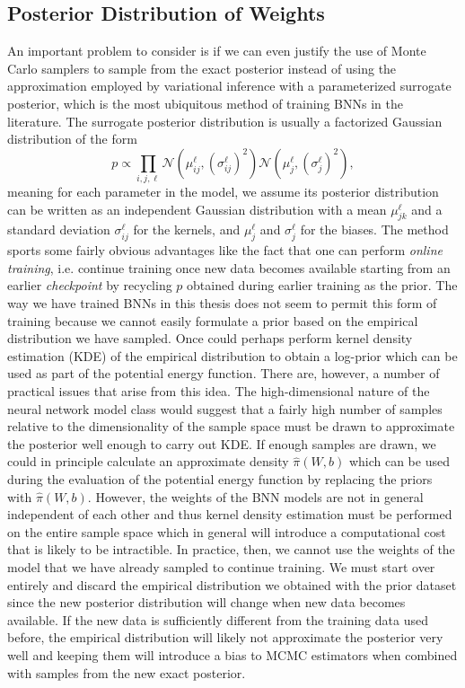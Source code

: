 \subsection{Posterior Distribution of Weights}
An important problem to consider is if we can even justify the use of Monte Carlo samplers to sample from the exact posterior instead of using the approximation employed by variational inference with a parameterized surrogate posterior, which is the most ubiquitous method of training BNNs in the literature. The surrogate posterior distribution is usually a factorized Gaussian distribution of the form
\begin{equation}\label{eq:surrogate_dist}
    p \propto \prod_{i, j, \ell} \mathcal{N}(\mu_{ij}^\ell, (\sigma_{ij}^\ell)^2) \mathcal{N}(\mu_{j}^\ell, (\sigma_{j}^\ell)^2),
\end{equation}
meaning for each parameter in the model, we assume its posterior distribution can be written as an independent Gaussian distribution with a mean $\mu_{jk}^\ell$ and a standard deviation $\sigma_{ij}^\ell$ for the kernels, and $\mu_j^\ell$ and $\sigma_j^\ell$ for the biases. The method sports some fairly obvious advantages like the fact that one can perform \textit{online training}, i.e. continue training once new data becomes available starting from an earlier \textit{checkpoint} by recycling $p$ obtained during earlier training as the prior. The way we have trained BNNs in this thesis does not seem to permit this form of training because we cannot easily formulate a prior based on the empirical distribution we have sampled. Once could perhaps perform kernel density estimation (KDE) of the empirical distribution to obtain a log-prior which can be used as part of the potential energy function. There are, however, a number of practical issues that arise from this idea. The high-dimensional nature of the neural network model class would suggest that a fairly high number of samples relative to the dimensionality of the sample space must be drawn to approximate the posterior well enough to carry out KDE. If enough samples are drawn, we could in principle calculate an approximate density $\hat{\pi}(W, b)$ which can be used during the evaluation of the potential energy function by replacing the priors with $\hat{\pi}(W, b)$. However, the weights of the BNN models are not in general independent of each other and thus kernel density estimation must be performed on the entire sample space which in general will introduce a computational cost that is likely to be intractible.
In practice, then, we cannot use the weights of the model that we have already sampled to continue training. We must start over entirely and discard the empirical distribution we obtained with the prior dataset since the new posterior distribution will change when new data becomes available. If the new data is sufficiently different from the training data used before, the empirical distribution will likely not approximate the posterior very well and keeping them will introduce a bias to MCMC estimators when combined with samples from the new exact posterior.

